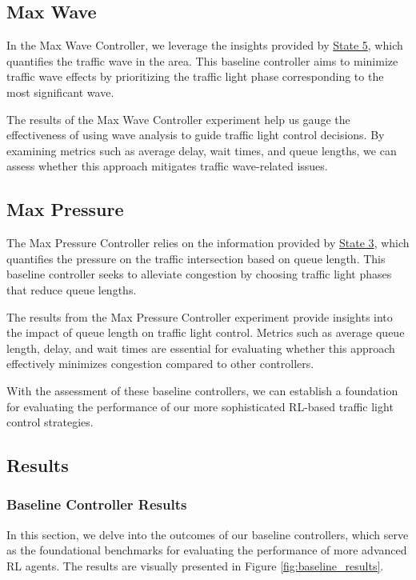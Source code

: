 \subsection{Max Wave}
In the Max Wave Controller, we leverage the insights provided by \hyperref[subsec:state-5]{State 5}, which quantifies the traffic wave in the area. This baseline controller aims to minimize traffic wave effects by prioritizing the traffic light phase corresponding to the most significant wave.

The results of the Max Wave Controller experiment help us gauge the effectiveness of using wave analysis to guide traffic light control decisions. By examining metrics such as average delay, wait times, and queue lengths, we can assess whether this approach mitigates traffic wave-related issues.

\subsection{Max Pressure}
The Max Pressure Controller relies on the information provided by \hyperref[subsec:state-3]{State 3}, which quantifies the pressure on the traffic intersection based on queue length. This baseline controller seeks to alleviate congestion by choosing traffic light phases that reduce queue lengths.

The results from the Max Pressure Controller experiment provide insights into the impact of queue length on traffic light control. Metrics such as average queue length, delay, and wait times are essential for evaluating whether this approach effectively minimizes congestion compared to other controllers.

With the assessment of these baseline controllers, we can establish a foundation for evaluating the performance of our more sophisticated RL-based traffic light control strategies.

\subsection{Results}
\subsubsection{Baseline Controller Results}
In this section, we delve into the outcomes of our baseline controllers, which serve as the foundational benchmarks for evaluating the performance of more advanced RL agents. The results are visually presented in Figure \ref{fig:baseline_results}.

